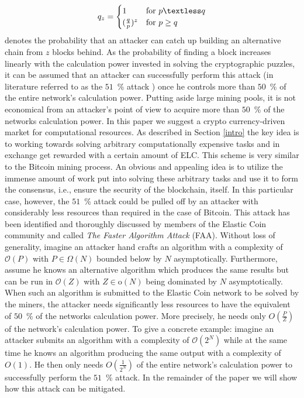 \documentclass{sig-alternate}
\begin{document}
\begin{equation*}
   q_z =
   \begin{cases}
     1 & \text{for } p \textless q \\
     (\frac{q}{p})^z & \text{for } p \geq q \\
   \end{cases}
\end{equation*}
denotes the probability that an attacker can catch up building an alternative chain from $z$ blocks behind.
As the probability of finding a block increases linearly with the calculation power invested in solving the cryptographic puzzles, it can be assumed that an attacker can successfully perform this attack (in literature referred to as the $51$~\% attack \cite{eyal2014majority,vasek2014empirical}) once he controls more than $50$~\% of the entire network's calculation power.
Putting aside large mining pools, it is not economical from an attacker's point of view to acquire more than $50$~\% of the networks calculation power.
In this paper we suggest a crypto currency-driven market for computational resources. As described in Section \ref{intro} the key idea is to working towards solving arbitrary computationally expensive tasks and in exchange get rewarded with a certain amount of ELC.
This scheme is very similar to the Bitcoin mining process.
An obvious and appealing idea is to utilize the immense amount of work put into solving these arbitrary tasks and use it to form the consensus, i.e., ensure the security of the blockchain, itself. In this particular case, however, the $51$~\% attack could be pulled off by an attacker with considerably less resources than required in the case of Bitcoin. This attack has been identified and thoroughly discussed by members of the Elastic Coin community and called \emph{The Faster Algorithm Attack} (FAA).
Without loss of generality, imagine an attacker hand crafts an algorithm with a complexity of $\mathcal{O}(P)$ with $P \in \Omega(N)$ bounded below by $N$ asymptotically.
Furthermore, assume he knows an alternative algorithm which produces the same results but can be run in $\mathcal{O}(Z)$ with $Z \in \text{o}(N)$ being dominated by $N$ asymptotically.
When such an algorithm is submitted to the Elastic Coin network to be solved by the miners, the attacker needs significantly less resources to have the equivalent of $50$~\% of the networks calculation power. More precisely, he needs only $O(\frac{P}{Z})$ of the network's calculation power.
To give a concrete example: imagine an attacker submits an algorithm with a complexity of $\mathcal{O}(2^N)$ while at the same time he knows an algorithm producing the same output with a complexity of $O(1)$. He then only needs $O(\frac{1}{2^N})$ of the entire network's calculation power to successfully perform the $51$~\% attack.
In the remainder of the paper we will show how this attack can be mitigated.
\end{document}
